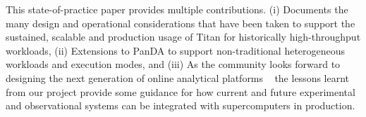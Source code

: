 This state-of-practice paper provides multiple contributions.  (i) Documents
the many design and operational considerations that have been  taken to
support the sustained, scalable and production usage of Titan for historically
high-throughput workloads, (ii) Extensions to PanDA to support non-traditional
heterogeneous workloads and execution modes,  and (iii) As the community looks
forward to designing the next generation of online analytical platforms
~\cite{foap} the lessons learnt from our project provide some guidance for how
current and future experimental and observational systems can be integrated
with supercomputers in production.











